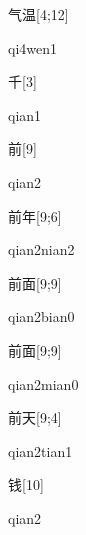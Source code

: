 \begin{verbete}[qi4wen1]{气温}[4;12]
\begin{pronuncia}{qi4wen1}
\end{pronuncia}
\end{verbete}

\begin{verbete}[qian1]{千}[3]
\begin{pronuncia}{qian1}
\end{pronuncia}
\end{verbete}

\begin{verbete}[qian2]{前}[9]
\begin{pronuncia}{qian2}
\end{pronuncia}
\end{verbete}

\begin{verbete}{前年}[9;6]
\begin{pronuncia}{qian2nian2}
\end{pronuncia}
\end{verbete}

\begin{verbete}{前面}[9;9]
\begin{pronuncia}{qian2bian0}
\end{pronuncia}
\end{verbete}

\begin{verbete}{前面}[9;9]
\begin{pronuncia}{qian2mian0}
\end{pronuncia}
\end{verbete}

\begin{verbete}{前天}[9;4]
\begin{pronuncia}{qian2tian1}
\end{pronuncia}
\end{verbete}

\begin{verbete}[qian2]{钱}[10]
\begin{pronuncia}{qian2}
\end{pronuncia}
\end{verbete}

